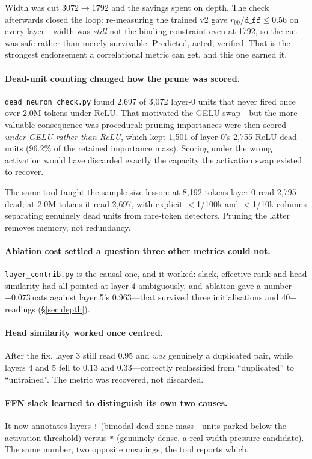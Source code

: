 \documentclass[11pt,a4paper]{article}
\newcommand{\dff}{\texttt{d\_ff}}
\newcommand{\nats}[1]{\ensuremath{#1}\,nats}
\begin{document}
Width was cut $3072 \to 1792$ and the savings spent on depth. The check afterwards closed the
loop: re-measuring the trained v2 gave $r_{99}/\dff \leq 0.56$ on every layer---width was
\emph{still} not the binding constraint even at 1792, so the cut was safe rather than merely
survivable. Predicted, acted, verified. That is the strongest endorsement a correlational
metric can get, and this one earned it.

\paragraph{Dead-unit counting changed how the prune was scored.}
\texttt{dead\_neuron\_check.py} found 2{,}697 of 3{,}072 layer-0 units that never fired once
over 2.0M tokens under ReLU. That motivated the GELU swap---but the more valuable consequence
was procedural: pruning importances were then scored \emph{under GELU rather than ReLU}, which
kept 1{,}501 of layer 0's 2{,}755 ReLU-dead units (96.2\% of the retained importance mass).
Scoring under the wrong activation would have discarded exactly the capacity the activation
swap existed to recover.

The same tool taught the sample-size lesson: at 8{,}192 tokens layer 0 read 2{,}795 dead; at
2.0M tokens it read 2{,}697, with explicit $<$1/100k and $<$1/10k columns separating genuinely
dead units from rare-token detectors. Pruning the latter removes memory, not redundancy.

\paragraph{Ablation cost settled a question three other metrics could not.}
\texttt{layer\_contrib.py} is the causal one, and it worked: slack, effective rank and head
similarity had all pointed at layer 4 ambiguously, and ablation gave a number---\nats{{+}0.073}
against layer 5's 0.963---that survived three initialisations and 40+ readings
(\S\ref{sec:depth}).

\paragraph{Head similarity worked once centred.} After the fix, layer 3 still read 0.95 and
\emph{was} genuinely a duplicated pair, while layers 4 and 5 fell to 0.13 and 0.33---correctly
reclassified from ``duplicated'' to ``untrained''. The metric was recovered, not discarded.

\paragraph{FFN slack learned to distinguish its own two causes.} It now annotates layers
\texttt{!} (bimodal dead-zone mass---units parked below the activation threshold) versus
\texttt{*} (genuinely dense, a real width-pressure candidate). The same number, two opposite
meanings; the tool reports which.
\end{document}
